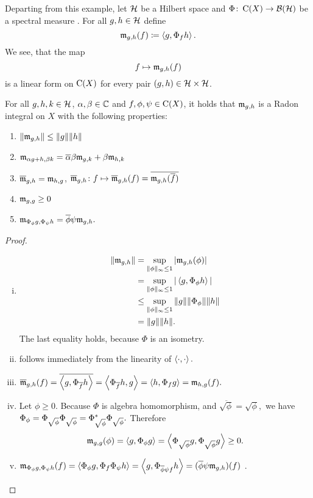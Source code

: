 Departing from this example, let $\mathcal{H}$ be a Hilbert space and 
$\Phi\colon \operatorname{C}(X) \to \mathcal{B}(\mathcal{H})$
be a spectral measure .
For all $g , h \in \mathcal{H}$ define
\[
 \mathfrak{m}_{g, h} (f) \coloneqq \left\langle g, \Phi_f h \right\rangle.
\]
We see, that the map 
\[
 f \mapsto \mathfrak{m}_{g,h} (f)
\]
is a linear form on $\operatorname{C} (X)$ for every pair $(g, h) \in \mathcal{H} \times \mathcal{H}$.
\begin{thrm} \label{measureproperties}
For all $g, h,k \in \mathcal{H}$, $\alpha, \beta \in \mathbb{C}$ and $f, \phi, \psi \in 
\operatorname{C}(X)$, it holds that $\mathfrak{m}_{g,h}$ is a Radon integral on $X$ with the following 
properties:
\begin{enumerate}[{(}i{)}]
 \item $\| \mathfrak{m}_{g,h}\| \leq \|g\| \|h\|$
 \item $\mathfrak{m}_{\alpha g + h, \beta k} = \overline{\alpha}\beta \mathfrak{m}_{g,k} + 
 \beta \mathfrak{m}_{h,k}$
 \item $\overline{\mathfrak{m}}_{g,h} = \mathfrak{m}_{h,g}$, $\overline{\mathfrak{m}}_{g,h} \colon 
 f \mapsto \overline{\mathfrak{m}}_{g,h}(f) = \overline{\mathfrak{m}_{g,h}(\overline{f})}$
 \item $\mathfrak{m}_{g,g} \geq 0$
 \item $\mathfrak{m}_{\Phi_\phi g, \Phi_\psi h} = \overline{\phi} \psi \mathfrak{m}_{g,h}.$
\end{enumerate}

\end{thrm}

\begin{proof}
 \begin{enumerate}[(i)]
  \item \begin{align*}
         \| \mathfrak{m}_{g,h} \| &= \sup\limits_{\| \phi \| _\infty \leq 1} | \mathfrak{m}_{g,h}(\phi) | \\
			&= \sup\limits_{\| \phi \| _\infty \leq 1} | \left\langle g, \Phi_\phi h \right\rangle | \\
			&\leq \sup\limits_{\| \phi \| _\infty \leq 1} \| g \| \|\Phi_\phi \| \| h\| \\
			&= \|g\| \|h\|.
        \end{align*}
  The last equality holds, because $\Phi$ is an isometry.
 \item follows immediately from the linearity of $\left\langle \cdot , \cdot \right\rangle.$
 
 \item $\overline{\mathfrak{m}}_{g,h}(f) = \overline{\left\langle g, \Phi_{\overline{f}}h \right\rangle} = 
 \left\langle \Phi_{\overline{f}}h ,g \right\rangle =\left\langle h,\Phi_{f}g \right\rangle = \mathfrak{m}_{h,g}(f).$
	
       \item Let $\phi \geq 0$. Because $\Phi$ is algebra homomorphism, and 
       $\overline{\sqrt{\phi}} = \sqrt{\phi},$ we have 
	$ \Phi_\phi = \Phi_{\sqrt{\phi}} \Phi_{\sqrt{\phi}} =
	  \Phi^{*}_{\sqrt{\phi}} \Phi_{\sqrt{\phi}}.$
	Therefore 
	\[\mathfrak{m}_{g,g}(\phi) = \left\langle g, \Phi_\phi g \right\rangle = \left\langle \Phi_{\sqrt{\phi}}g,
	\Phi_{\sqrt{\phi}}g \right\rangle \geq 0. \]
	
 \item	$\mathfrak{m}_{\Phi_\phi g, \Phi_\psi h} (f ) = \left\langle \Phi_\phi g, \Phi_f 
	\Phi_\psi h \right\rangle = \left\langle g , \Phi_{\overline{\phi} \psi f} h  \right\rangle = (\overline{\phi}
      \psi \mathfrak{m}_{g,h})(f)$ .

\end{enumerate}

\end{proof}

